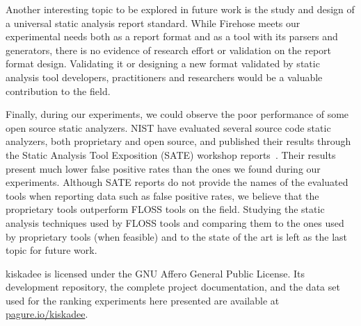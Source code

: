 Another interesting topic to be explored in future work is the study and design
of a universal static analysis report standard. While Firehose meets our
experimental needs both as a report format and as a tool with its parsers and
generators, there is no evidence of research effort or validation on the report
format design. Validating it or designing a new format validated by static
analysis tool developers, practitioners and researchers would be a valuable
contribution to the field.

Finally, during our experiments, we could observe the poor performance of some
open source static analyzers. NIST have evaluated several source code static
analyzers, both proprietary and open source, and published their results
through the Static Analysis Tool Exposition (SATE) workshop
reports~\citep{okun2013report}. Their results present much lower false positive
rates than the ones we found during our experiments. Although SATE reports do
not provide the names of the evaluated tools when reporting data such as false
positive rates, we believe that the proprietary tools outperform FLOSS tools on
the field. Studying the static analysis techniques used by FLOSS tools and
comparing them to the ones used by proprietary tools (when feasible) and to the
state of the art is left as the last topic for future work.

kiskadee is licensed under the GNU Affero General Public License. Its
development repository, the complete project documentation, and the data set
used for the ranking experiments here presented are available at
\url{pagure.io/kiskadee}.
